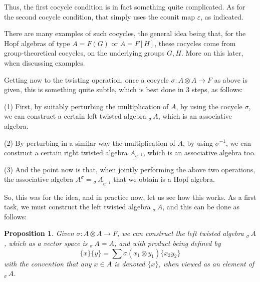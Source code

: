 \documentclass[12pt]{amsbook}
\newtheorem{proposition}[theorem]{Proposition}
\begin{document}
Thus, the first cocycle condition is in fact something quite complicated. As for the second cocycle condition, that simply uses the counit map $\varepsilon$, as indicated.

\bigskip

There are many examples of such cocycles, the general idea being that, for the Hopf algebras of type $A=F(G)$ or $A=F[H]$, these cocycles come from group-theoretical cocycles, on the underlying groups $G,H$. More on this later, when discussing examples.

\bigskip

Getting now to the twisting operation, once a cocycle $\sigma:A\otimes A\to F$ as above is given, this is something quite subtle, which is best done in 3 steps, as follows:

\bigskip

(1) First, by suitably perturbing the multiplication of $A$, by using the cocycle $\sigma$, we can construct a certain left twisted algebra $_{\sigma}\!\,A$, which is an associative algebra.

\bigskip

(2) By perturbing in a similar way the multiplication of $A$, by using $\sigma^{-1}$, we can construct a certain right twisted algebra $A_{\sigma^{-1}}$, which is an associative algebra too.

\bigskip

(3) And the point now is that, when jointly performing the above two operations, the associative algebra $A^\sigma={_{\sigma}\!\,A}_{\sigma^{-1}}$ that we obtain is a Hopf algebra.

\bigskip

So, this was for the idea, and in practice now, let us see how this works. As a first task, we must construct the left twisted algebra $_{\sigma}\!\,A$, and this can be done as follows:

\begin{proposition}
Given $\sigma:A\otimes A\to F$, we can construct the left twisted algebra $_{\sigma}\!\,A$, which as a vector space is $_{\sigma}\!\,A=A$, and with product being defined by 
$$\{x\}\{y\}=\sum\sigma(x_1\otimes y_1)\{x_2y_2\}$$ 
with the convention that any $x\in A$ is denoted $\{x\}$, when viewed as an element 
of $_{\sigma}\!\,A$.
\end{proposition}
\end{document}
